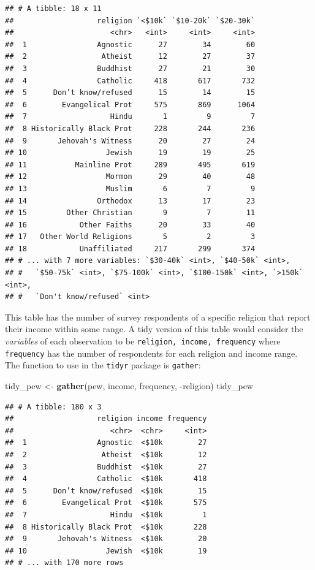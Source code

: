 \documentclass[]{article}
\newenvironment{Shaded}{\begin{snugshade}}{\end{snugshade}}
\newcommand{\KeywordTok}[1]{\textcolor[rgb]{0.13,0.29,0.53}{\textbf{{#1}}}}
\newcommand{\StringTok}[1]{\textcolor[rgb]{0.31,0.60,0.02}{{#1}}}
\newcommand{\NormalTok}[1]{{#1}}
\theoremstyle{definition}
\theoremstyle{definition}
\theoremstyle{remark}
\begin{document}
\begin{verbatim}
## # A tibble: 18 x 11
##                   religion `<$10k` `$10-20k` `$20-30k`
##                      <chr>   <int>     <int>     <int>
##  1                Agnostic      27        34        60
##  2                 Atheist      12        27        37
##  3                Buddhist      27        21        30
##  4                Catholic     418       617       732
##  5      Don’t know/refused      15        14        15
##  6        Evangelical Prot     575       869      1064
##  7                   Hindu       1         9         7
##  8 Historically Black Prot     228       244       236
##  9       Jehovah's Witness      20        27        24
## 10                  Jewish      19        19        25
## 11           Mainline Prot     289       495       619
## 12                  Mormon      29        40        48
## 13                  Muslim       6         7         9
## 14                Orthodox      13        17        23
## 15         Other Christian       9         7        11
## 16            Other Faiths      20        33        40
## 17   Other World Religions       5         2         3
## 18            Unaffiliated     217       299       374
## # ... with 7 more variables: `$30-40k` <int>, `$40-50k` <int>,
## #   `$50-75k` <int>, `$75-100k` <int>, `$100-150k` <int>, `>150k` <int>,
## #   `Don't know/refused` <int>
\end{verbatim}

This table has the number of survey respondents of a specific religion
that report their income within some range. A tidy version of this table
would consider the \emph{variables} of each observation to be
\texttt{religion,\ income,\ frequency} where \texttt{frequency} has the
number of respondents for each religion and income range. The function
to use in the \texttt{tidyr} package is \texttt{gather}:

\begin{Shaded}
\begin{Highlighting}[]
\NormalTok{tidy_pew <-}\StringTok{ }\KeywordTok{gather}\NormalTok{(pew, income, frequency, -religion)}
\NormalTok{tidy_pew}
\end{Highlighting}
\end{Shaded}

\begin{verbatim}
## # A tibble: 180 x 3
##                   religion income frequency
##                      <chr>  <chr>     <int>
##  1                Agnostic  <$10k        27
##  2                 Atheist  <$10k        12
##  3                Buddhist  <$10k        27
##  4                Catholic  <$10k       418
##  5      Don’t know/refused  <$10k        15
##  6        Evangelical Prot  <$10k       575
##  7                   Hindu  <$10k         1
##  8 Historically Black Prot  <$10k       228
##  9       Jehovah's Witness  <$10k        20
## 10                  Jewish  <$10k        19
## # ... with 170 more rows
\end{verbatim}
\end{document}

